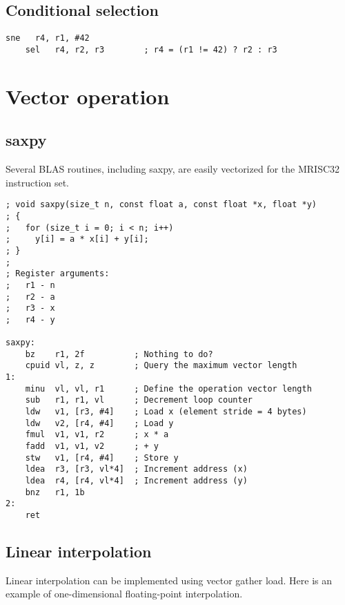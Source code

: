 \subsection{Conditional selection}

\begin{lstlisting}[style=assembler]
    sne   r4, r1, #42
    sel   r4, r2, r3        ; r4 = (r1 != 42) ? r2 : r3
\end{lstlisting}

\section{Vector operation}

\subsection{saxpy}

Several BLAS routines, including saxpy, are easily vectorized for the MRISC32
instruction set.

\begin{lstlisting}[style=assembler]
; void saxpy(size_t n, const float a, const float *x, float *y)
; {
;   for (size_t i = 0; i < n; i++)
;     y[i] = a * x[i] + y[i];
; }
;
; Register arguments:
;   r1 - n
;   r2 - a
;   r3 - x
;   r4 - y

saxpy:
    bz    r1, 2f          ; Nothing to do?
    cpuid vl, z, z        ; Query the maximum vector length
1:
    minu  vl, vl, r1      ; Define the operation vector length
    sub   r1, r1, vl      ; Decrement loop counter
    ldw   v1, [r3, #4]    ; Load x (element stride = 4 bytes)
    ldw   v2, [r4, #4]    ; Load y
    fmul  v1, v1, r2      ; x * a
    fadd  v1, v1, v2      ; + y
    stw   v1, [r4, #4]    ; Store y
    ldea  r3, [r3, vl*4]  ; Increment address (x)
    ldea  r4, [r4, vl*4]  ; Increment address (y)
    bnz   r1, 1b
2:
    ret
\end{lstlisting}

\subsection{Linear interpolation}

Linear interpolation can be implemented using vector gather load. Here is an
example of one-dimensional floating-point interpolation.

